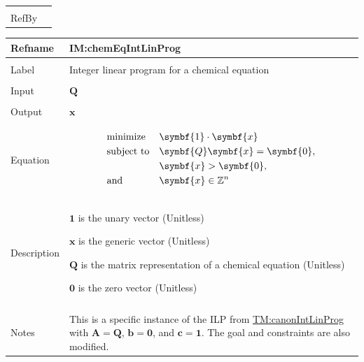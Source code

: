 \documentclass[12pt]{article}
\newcommand{\gt}{\ensuremath >}
\begin{document}
\begin{minipage}{\textwidth}
\begin{tabular}{>{\raggedright}p{}>{\raggedright\arraybackslash}p{}}
\\ \midrule \\
RefBy & 
\\ \bottomrule
\end{tabular}
\end{minipage}
\vspace{\baselineskip}
\noindent
\begin{minipage}{\textwidth}
\begin{tabular}{>{\raggedright}p{}>{\raggedright\arraybackslash}p{}}
\toprule \textbf{Refname} & \textbf{IM:chemEqIntLinProg}
\label{IM:chemEqIntLinProg}
\\ \midrule \\
Label & Integer linear program for a chemical equation
        
\\ \midrule \\
Input & $\symbf{Q}$
        
\\ \midrule \\
Output & $\symbf{x}$
         
\\ \midrule \\
Equation & \begin{displaymath}
           \begin{aligned}
            & \text{minimize} &  & \symbf{1}\cdot{}\symbf{x}\\
            & \text{subject to} &  & \symbf{Q} \symbf{x}=\symbf{0},\\
            & \, &  & \symbf{x}\gt{}\symbf{0},\\
            & \text{and} &  & \symbf{x}\in{}\mathbb{Z}^{n}
           \end{aligned}
           \end{displaymath}
\\ \midrule \\
Description & \begin{symbDescription}
              \item{$\symbf{1}$ is the unary vector (Unitless)}
              \item{$\symbf{x}$ is the generic vector (Unitless)}
              \item{$\symbf{Q}$ is the matrix representation of a chemical equation (Unitless)}
              \item{$\symbf{0}$ is the zero vector (Unitless)}
              \end{symbDescription}
\\ \midrule \\
Notes & This is a specific instance of the ILP from \hyperref[TM:canonIntLinProg]{TM:canonIntLinProg} with $\symbf{A}=\symbf{Q}$, $\symbf{b}=\symbf{0}$, and $\symbf{c}=\symbf{1}$. The goal and constraints are also modified.
        

\end{tabular}
\end{minipage}
\end{document}
